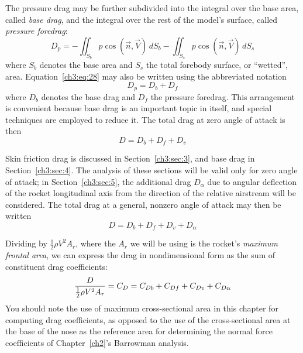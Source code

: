 The pressure drag may be further subdivided into the integral over the base area,
called \emph{base drag}, and the integral over the rest of the model's surface,
called \emph{pressure foredrag}:
\begin{equation}\label{ch3:eq:28}
D_p = -\iint_{S_b} p\cos(\vec{n},\vec{V})\,dS_b
  - \iint_{S_s} p\cos(\vec{n},\vec{V})\,dS_s
\end{equation}
where $S_b$ denotes the base area and $S_s$ the total forebody surface, or
``wetted'', area. Equation~\eqref{ch3:eq:28} may also be written using the
abbreviated notation
\begin{equation}\label{ch3:eq:29}
D_p = D_b + D_f
\end{equation}
where $D_b$ denotes the base drag and $D_f$ the pressure foredrag. This arrangement
is convenient because base drag is an important topic in itself, and special
techniques are employed to reduce it. The total drag at zero angle of attack is then
\begin{equation}\label{ch3:eq:30}
D = D_b + D_f + D_v
\end{equation}

Skin friction drag is discussed in Section~\ref{ch3:sec:3}, and base drag in
Section~\ref{ch3:sec:4}. The analysis of these sections will be valid only for zero
angle of attack; in Section~\ref{ch3:sec:5}, the additional drag $D_\alpha$ due to
angular deflection of the rocket longitudinal axis from the direction of the
relative airstream will be considered. The total drag at a general, nonzero angle of
attack may then be written
\begin{equation}\label{ch3:eq:31}
D = D_b + D_f + D_v + D_\alpha
\end{equation}

Dividing by $\tfrac{1}{2}\rho V^{2}A_r$, where the $A_r$ we will be using is the
rocket's \emph{maximum frontal area}, we can express the drag in nondimensional form
as the sum of constituent drag coefficients:
\begin{equation}\label{ch3:eq:32}
\frac{D}{\tfrac{1}{2}\rho V^{2}A_r} = C_{D} = C_{Db} + C_{Df} + C_{Dv} + C_{D\alpha}
\end{equation}
You should note the use of maximum cross-sectional area in this chapter for
computing drag coefficients, as opposed to the use of the cross-sectional area at
the base of the nose as the reference area for determining the normal force
coefficients of Chapter~\ref{ch2}'s Barrowman analysis.

